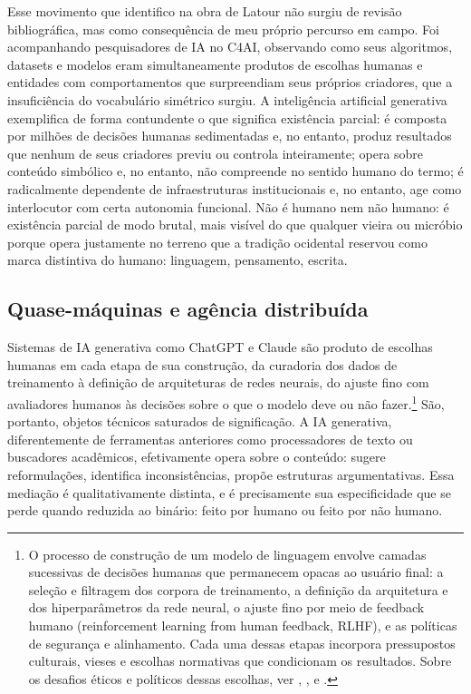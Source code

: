 Esse movimento que identifico na obra de Latour não surgiu de revisão bibliográfica, mas como consequência de meu próprio percurso em campo. Foi acompanhando pesquisadores de IA no C4AI, observando como seus algoritmos, datasets e modelos eram simultaneamente produtos de escolhas humanas e entidades com comportamentos que surpreendiam seus próprios criadores, que a insuficiência do vocabulário simétrico surgiu. A inteligência artificial generativa exemplifica de forma contundente o que significa existência parcial: é composta por milhões de decisões humanas sedimentadas e, no entanto, produz resultados que nenhum de seus criadores previu ou controla inteiramente; opera sobre conteúdo simbólico e, no entanto, não compreende no sentido humano do termo; é radicalmente dependente de infraestruturas institucionais e, no entanto, age como interlocutor com certa autonomia funcional. Não é humano nem não humano: é existência parcial de modo brutal, mais visível do que qualquer vieira ou micróbio porque opera justamente no terreno que a tradição ocidental reservou como marca distintiva do humano: linguagem, pensamento, escrita.


\subsection*{Quase-máquinas e agência distribuída}

Sistemas de IA generativa como ChatGPT e Claude são produto de escolhas humanas em cada etapa de sua construção, da curadoria dos dados de treinamento à definição de arquiteturas de redes neurais, do ajuste fino com avaliadores humanos às decisões sobre o que o modelo deve ou não fazer.\footnote{O processo de construção de um modelo de linguagem envolve camadas sucessivas de decisões humanas que permanecem opacas ao usuário final: a seleção e filtragem dos corpora de treinamento, a definição da arquitetura e dos hiperparâmetros da rede neural, o ajuste fino por meio de feedback humano (reinforcement learning from human feedback, RLHF), e as políticas de segurança e alinhamento. Cada uma dessas etapas incorpora pressupostos culturais, vieses e escolhas normativas que condicionam os resultados. Sobre os desafios éticos e políticos dessas escolhas, ver \textcite{Buolamwini2023Unmasking}, \textcite{Noble2018Algorithms}, \textcite{Benjamin2019RaceAfter} e \textcite{Christian2020Alignment}.} São, portanto, objetos técnicos saturados de significação. A IA generativa, diferentemente de ferramentas anteriores como processadores de texto ou buscadores acadêmicos, efetivamente opera sobre o conteúdo: sugere reformulações, identifica inconsistências, propõe estruturas argumentativas. Essa mediação é qualitativamente distinta, e é precisamente sua especificidade que se perde quando reduzida ao binário: feito por humano ou feito por não humano.

